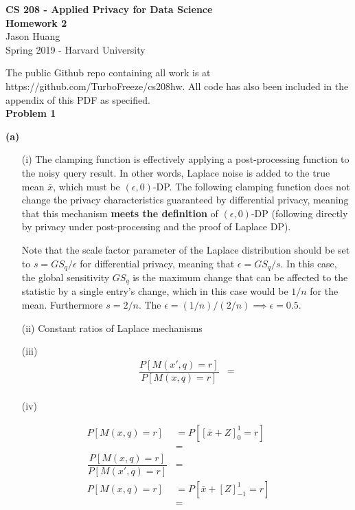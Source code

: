 \documentclass[12pt]{article}
\begin{document}
\begin{center}
	{\Large \textbf{CS 208 - Applied Privacy for Data Science}}\\
	{\Large \textbf{Homework 2}}\\
	\vspace*{0.1in}
	Jason Huang\\
	Spring 2019 - Harvard University\\
\end{center}

The public Github repo containing all work is at https://github.com/TurboFreeze/cs208hw. All code has also been included in the appendix of this PDF as specified.\\

{\large\textbf{Problem 1}}

\textbf{(a)}
\begin{enumerate}
	\item[(i)] The clamping function is effectively applying a post-processing function to the noisy query result. In other words, Laplace noise is added to the true mean $\bar{x}$, which must be $(\epsilon, 0)$-DP. The following clamping function does not change the privacy characteristics guaranteed by differential privacy, meaning that this mechanism \textbf{meets the definition} of $(\epsilon, 0)$-DP (following directly by privacy under post-processing and the proof of Laplace DP).
	
	Note that the scale factor parameter of the Laplace distribution should be set to $s = GS_q/\epsilon$ for differential privacy, meaning that $\epsilon = GS_q/s$. In this case, the global sensitivity $GS_q$ is the maximum change that can be affected to the statistic by a single entry's change, which in this case would be $1/n$ for the mean. Furthermore $s = 2 / n$. The $\epsilon = (1/n) / (2/n) \implies \boxed{\epsilon= 0.5}$.
	\item[(ii)] Constant ratios of Laplace mechanisms
	\item[(iii)] 
	\begin{align*}
		\dfrac{P[M(x', q) = r]}{P[M(x, q)=r]} &= \\
	\end{align*}
	\item[(iv)] 
\end{enumerate}
\begin{align*}
	P[M(x, q) = r] &= P[[\bar{x} + Z]^1_0 = r]\\
	&= \\
	\dfrac{P[M(x, q) = r]}{P[M(x', q)=r]} &= \\
	P[M(x, q) = r] &= P[\bar{x} + [Z]^1_{-1} = r]\\
	&= \\
\end{align*}
\end{document}
